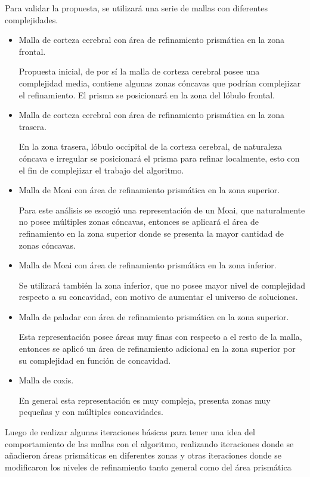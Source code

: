 Para validar la propuesta, se utilizará una serie de mallas con diferentes complejidades.
\begin{itemize}
    \item Malla de corteza cerebral con área de refinamiento prismática en la zona frontal.

        Propuesta inicial, de por sí la malla de corteza cerebral posee una complejidad media, contiene algunas zonas cóncavas que podrían complejizar el refinamiento. El prisma se posicionará en la zona del lóbulo frontal.
    \item Malla de corteza cerebral con área de refinamiento prismática en la zona trasera.

        En la zona trasera, lóbulo occipital de la corteza cerebral, de naturaleza cóncava e irregular se posicionará el prisma para refinar localmente, esto con el fin de complejizar el trabajo del algoritmo.
    \item Malla de Moai con área de refinamiento prismática en la zona superior.

        Para este análisis se escogió una representación de un Moai, que naturalmente no posee múltiples zonas cóncavas, entonces se aplicará el área de refinamiento en la zona superior donde se presenta la mayor cantidad de zonas cóncavas. 
    \item Malla de Moai con área de refinamiento prismática en la zona inferior.

        Se utilizará también la zona inferior, que no posee mayor nivel de complejidad respecto a su concavidad, con motivo de aumentar el universo de soluciones.
    \item Malla de paladar con área de refinamiento prismática en la zona superior.

        Esta representación posee áreas muy finas con respecto a el resto de la malla, entonces se aplicó un área de refinamiento adicional en la zona superior por su complejidad en función de concavidad.
    \item Malla de coxis.

        En general esta representación es muy compleja, presenta zonas muy pequeñas y con múltiples concavidades.
\end{itemize}

Luego de realizar algunas iteraciones básicas para tener una idea del comportamiento de las mallas con el algoritmo, realizando iteraciones donde se añadieron áreas prismáticas en diferentes zonas y otras iteraciones donde se modificaron los niveles de refinamiento tanto general como del área prismática

